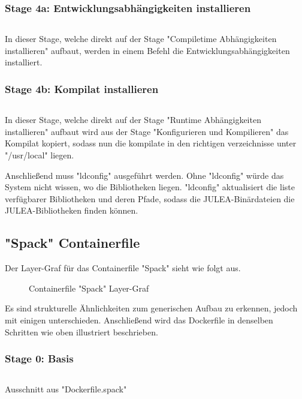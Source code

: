 \subsubsection{Stage 4a: Entwicklungsabhängigkeiten installieren}

\inputminted[firstline=61,lastline=65]{dockerfile}{./code-examples/Dockerfile.system}

In dieser Stage, welche direkt auf der Stage "Compiletime Abhängigkeiten installieren" aufbaut, werden in einem Befehl die Entwicklungsabhängigkeiten installiert.

\subsubsection{Stage 4b: Kompilat installieren}

\inputminted[firstline=55,lastline=58]{dockerfile}{./code-examples/Dockerfile.system}

In dieser Stage, welche direkt auf der Stage "Runtime Abhängigkeiten installieren" aufbaut wird aus der Stage "Konfigurieren und Kompilieren" das Kompilat kopiert, sodass nun die kompilate in den richtigen verzeichnisse unter "/usr/local" liegen.

Anschließend muss "ldconfig" ausgeführt werden. Ohne "ldconfig" würde das System nicht wissen, wo die Bibliotheken liegen. "ldconfig" aktualisiert die liste verfügbarer Bibliotheken und deren Pfade, sodass die JULEA-Binärdateien die JULEA-Bibliotheken finden können.

\subsection{"Spack" Containerfile}
Der Layer-Graf für das Containerfile "Spack" sieht wie folgt aus.
\begin{figure}[!htbp]
    \centering
    
    \caption{Containerfile "Spack" Layer-Graf}
\end{figure}

Es sind strukturelle Ähnlichkeiten zum generischen Aufbau zu erkennen, jedoch mit einigen unterschieden. Anschließend wird das Dockerfile in denselben Schritten wie oben illustriert beschrieben.

\subsubsection{Stage 0: Basis}

\begin{listing}[H]
    \inputminted[firstline=0,lastline=8]{dockerfile}{./code-examples/Dockerfile.spack}
    \caption{Ausschnitt aus "Dockerfile.spack"}
\end{listing}

